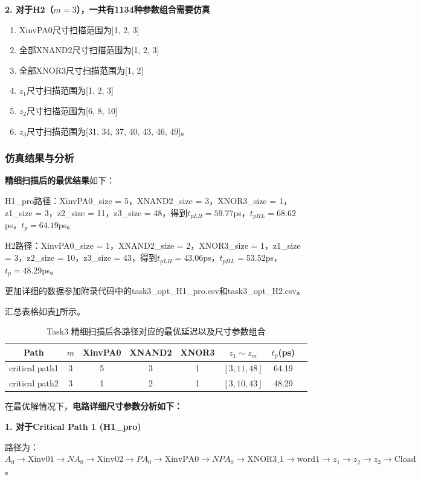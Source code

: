 \documentclass[UTF8,12pt,a4paper]{ctexart}
\begin{document}
\textbf{2. 对于H2（$m = 3$），一共有1134种参数组合需要仿真}
\begin{enumerate}
    \item XinvPA0尺寸扫描范围为[1, 2, 3]
    \item 全部XNAND2尺寸扫描范围为[1, 2, 3]
    \item 全部XNOR3尺寸扫描范围为[1, 2]
    \item $z_1$尺寸扫描范围为[1, 2, 3]
    \item $z_2$尺寸扫描范围为[6, 8, 10]
    \item $z_3$尺寸扫描范围为[31, 34, 37, 40, 43, 46, 49]。
\end{enumerate}


\subsubsection{仿真结果与分析}

\textbf{精细扫描后的最优结果}如下：

H1\_pro路径：XinvPA0\_size = 5，XNAND2\_size = 3，XNOR3\_size = 1，z1\_size = 3，z2\_size = 11，z3\_size = 48，得到$t_{pLH} = 59.77$ps，$t_{pHL} = 68.62$ps，$t_p = 64.19$ps。

H2路径：XinvPA0\_size = 1，XNAND2\_size = 2，XNOR3\_size = 1，z1\_size = 3，z2\_size = 10，z3\_size = 43，得到$t_{pLH} = 43.06$ps，$t_{pHL} = 53.52$ps，$t_p = 48.29$ps。

更加详细的数据参加附录代码中的task3\_opt\_H1\_pro.csv和task3\_opt\_H2.csv。

汇总表格如表\ref{tab:task3_final_best_tp}所示。

\begin{table}[htbp]
\centering
\caption{Task3 精细扫描后各路径对应的最优延迟以及尺寸参数组合}
\label{tab:task3_final_best_tp}
\small
\begin{tabular}{cccccccc}
\toprule
Path & $m$ & XinvPA0 & XNAND2 & XNOR3 & $z_1 \sim z_m$ & $t_p$(ps) \\
\midrule
critical path1 & 3 & 5 & 3 & 1 & $[3, 11, 48]$ & 64.19 \\
critical path2 & 3 & 1 & 2 & 1 & $[3, 10, 43]$ & 48.29 \\
\bottomrule
\end{tabular}
\end{table}

在最优解情况下，\textbf{电路详细尺寸参数分析如下：}

\textbf{1. 对于Critical Path 1 (H1\_pro)}

路径为：$A_0 \rightarrow \text{Xinv01} \rightarrow NA_0 \rightarrow \text{Xinv02} \rightarrow PA_0 \rightarrow \text{XinvPA0} \rightarrow NPA_0 \rightarrow \text{XNOR3\_1} \rightarrow \text{word1} \rightarrow z_1 \rightarrow z_2 \rightarrow z_3 \rightarrow \text{Cload}$。
\end{document}
